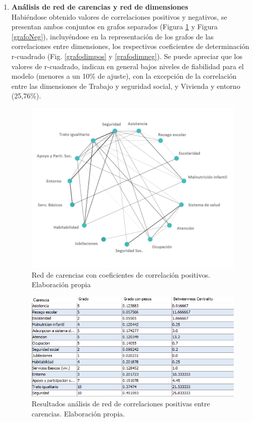 \documentclass[12pt,letterpaper,spanish]{article}
\begin{document}
\begin{enumerate}
\item \textbf{Análisis de red de carencias y red de dimensiones}\\
Habiéndose obtenido valores de correlaciones positivos y negativos, se presentan ambos conjuntos en grafos separados (Figura \ref{grafoPos} y Figura \ref{grafoNeg}), incluyéndose en la representación de los grafos de las correlaciones entre dimensiones, los respectivos coeficientes de determinación r-cuadrado (Fig. \ref{grafodimpos} y \ref{grafodimneg}). Se puede apreciar que los valores de r-cuadrado, indican en general bajos niveles de fiabilidad para el modelo (menores a un 10\% de ajuste), con la excepción de la correlación entre las dimensiones de Trabajo y seguridad social, y Vivienda y entorno (25,76\%).
\newpage
\begin{figure}[H]
    \centering
        \includegraphics[width=11cm]{Grafos/GrafoCarencias.png}
    \caption{Red de carencias con coeficientes de correlación positivos. Elaboración propia}
    \label{grafoPos}
\end{figure}
\begin{figure}[H]
    \centering
        \includegraphics[width=11cm]{analisis grafos/carencias_positivas.png}
    \caption{Resultados análisis de red de correlaciones positivas entre carencias. Elaboración propia.}
    \label{analisisPos}
\end{figure}
\newpage


\end{enumerate}
\end{document}
